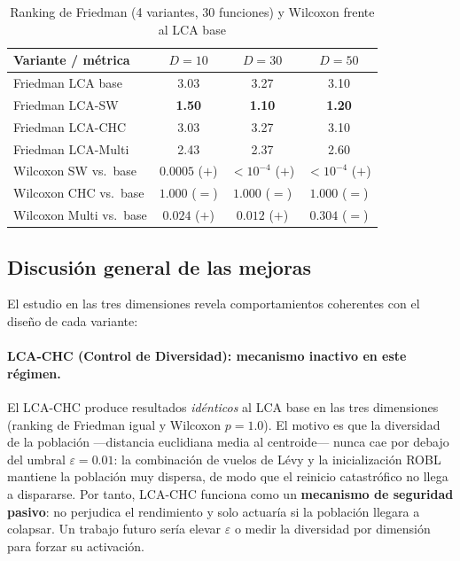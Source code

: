 \begin{table}[h!]
\centering
\caption{Ranking de Friedman (4 variantes, 30 funciones) y Wilcoxon frente al LCA base}
\label{tab:mejoras_friedman}
\renewcommand{\arraystretch}{1.3}
\small
\begin{tabular}{@{}lccc@{}}
\toprule
\textbf{Variante / métrica} & \textbf{$D=10$} & \textbf{$D=30$} & \textbf{$D=50$} \\
\midrule
Friedman LCA base   & 3.03 & 3.27 & 3.10 \\
Friedman LCA-SW     & \textbf{1.50} & \textbf{1.10} & \textbf{1.20} \\
Friedman LCA-CHC    & 3.03 & 3.27 & 3.10 \\
Friedman LCA-Multi  & 2.43 & 2.37 & 2.60 \\
\midrule
Wilcoxon SW vs.\ base    & $0.0005$ ($+$) & $<10^{-4}$ ($+$) & $<10^{-4}$ ($+$) \\
Wilcoxon CHC vs.\ base   & $1.000$ ($=$)  & $1.000$ ($=$)   & $1.000$ ($=$)   \\
Wilcoxon Multi vs.\ base & $0.024$ ($+$)  & $0.012$ ($+$)   & $0.304$ ($=$)   \\
\bottomrule
\end{tabular}
\end{table}

\subsection{Discusión general de las mejoras}

El estudio en las tres dimensiones revela comportamientos coherentes con el diseño de cada
variante:

\paragraph{LCA-CHC (Control de Diversidad): mecanismo inactivo en este régimen.}
El LCA-CHC produce resultados \emph{idénticos} al LCA base en las tres dimensiones (ranking
de Friedman igual y Wilcoxon $p = 1.0$). El motivo es que la diversidad de la población
—distancia euclidiana media al centroide— nunca cae por debajo del umbral $\varepsilon=0.01$:
la combinación de vuelos de Lévy y la inicialización ROBL mantiene la población muy dispersa,
de modo que el reinicio catastrófico no llega a dispararse. Por tanto, LCA-CHC funciona como
un \textbf{mecanismo de seguridad pasivo}: no perjudica el rendimiento y solo actuaría si la
población llegara a colapsar. Un trabajo futuro sería elevar $\varepsilon$ o medir la
diversidad por dimensión para forzar su activación.

